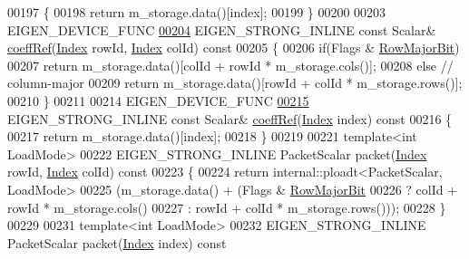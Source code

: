 \begin{DoxyCode}
00197     \{
00198       \textcolor{keywordflow}{return} m\_storage.data()[index];
00199     \}
00200 
00203     EIGEN\_DEVICE\_FUNC
\hyperlink{class_eigen_1_1_plain_object_base_ab1b33ee10e4c72ec5cf354d511900e62}{00204}     EIGEN\_STRONG\_INLINE \textcolor{keyword}{const} Scalar& \hyperlink{class_eigen_1_1_plain_object_base_ab1b33ee10e4c72ec5cf354d511900e62}{coeffRef}(\hyperlink{namespace_eigen_a62e77e0933482dafde8fe197d9a2cfde}{Index} rowId, \hyperlink{namespace_eigen_a62e77e0933482dafde8fe197d9a2cfde}{Index} colId)\textcolor{keyword}{ const}
00205 \textcolor{keyword}{    }\{
00206       \textcolor{keywordflow}{if}(Flags & \hyperlink{group__flags_gae4f56c2a60bbe4bd2e44c5b19cbe8762}{RowMajorBit})
00207         \textcolor{keywordflow}{return} m\_storage.data()[colId + rowId * m\_storage.cols()];
00208       \textcolor{keywordflow}{else} \textcolor{comment}{// column-major}
00209         \textcolor{keywordflow}{return} m\_storage.data()[rowId + colId * m\_storage.rows()];
00210     \}
00211 
00214     EIGEN\_DEVICE\_FUNC
\hyperlink{class_eigen_1_1_plain_object_base_a982b56223d011e2f836a3408983883d4}{00215}     EIGEN\_STRONG\_INLINE \textcolor{keyword}{const} Scalar& \hyperlink{class_eigen_1_1_plain_object_base_a982b56223d011e2f836a3408983883d4}{coeffRef}(\hyperlink{namespace_eigen_a62e77e0933482dafde8fe197d9a2cfde}{Index} index)\textcolor{keyword}{ const}
00216 \textcolor{keyword}{    }\{
00217       \textcolor{keywordflow}{return} m\_storage.data()[index];
00218     \}
00219 
00221     \textcolor{keyword}{template}<\textcolor{keywordtype}{int} LoadMode>
00222     EIGEN\_STRONG\_INLINE PacketScalar packet(\hyperlink{namespace_eigen_a62e77e0933482dafde8fe197d9a2cfde}{Index} rowId, \hyperlink{namespace_eigen_a62e77e0933482dafde8fe197d9a2cfde}{Index} colId)\textcolor{keyword}{ const}
00223 \textcolor{keyword}{    }\{
00224       \textcolor{keywordflow}{return} internal::ploadt<PacketScalar, LoadMode>
00225                (m\_storage.data() + (Flags & \hyperlink{group__flags_gae4f56c2a60bbe4bd2e44c5b19cbe8762}{RowMajorBit}
00226                                    ? colId + rowId * m\_storage.cols()
00227                                    : rowId + colId * m\_storage.rows()));
00228     \}
00229 
00231     \textcolor{keyword}{template}<\textcolor{keywordtype}{int} LoadMode>
00232     EIGEN\_STRONG\_INLINE PacketScalar packet(\hyperlink{namespace_eigen_a62e77e0933482dafde8fe197d9a2cfde}{Index} index)\textcolor{keyword}{ const}

\end{DoxyCode}
